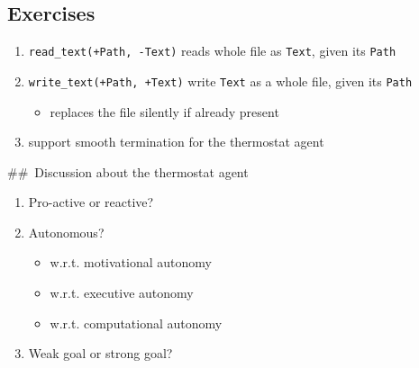 \hypertarget{exercises}{%
\subsection{Exercises}\label{exercises}}

\begin{enumerate}
\def\labelenumi{\arabic{enumi}.}
\item
  \texttt{read\_text(+Path,\ -Text)} reads whole file as \texttt{Text},
  given its \texttt{Path}
\item
  \texttt{write\_text(+Path,\ +Text)} write \texttt{Text} as a whole
  file, given its \texttt{Path}

  \begin{itemize}
  \tightlist
  \item
    replaces the file silently if already present
  \end{itemize}
\item
  support smooth termination for the thermostat agent
\end{enumerate}

\#\#~Discussion about the thermostat agent

\begin{enumerate}
\def\labelenumi{\arabic{enumi}.}
\item
  Pro-active or reactive?
\item
  Autonomous?

  \begin{itemize}
  \tightlist
  \item
    w.r.t. motivational autonomy
  \item
    w.r.t. executive autonomy
  \item
    w.r.t. computational autonomy
  \end{itemize}
\item
  Weak goal or strong goal?
\end{enumerate}
